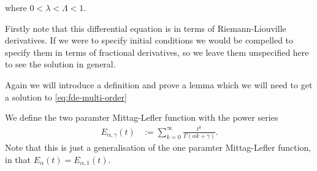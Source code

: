 \documentclass{unswmaths}
\begin{document}
where $ 0 < \lambda < \Lambda < 1 $.


Firstly note that this differential equation is in terms of Riemann-Liouville derivatives. If we were to specify
initial conditions we would be compelled to specify them in terms of fractional derivatives, so we leave them
unspecified here to see the solution in general.

Again we will introduce a definition and prove a lemma which we will need to get a solution to \ref{eq:fde-multi-order}

\begin{definition}
	\label{def:mit-lef-2}
	We define the two paramter Mittag-Lefler function with the power series
	\begin{align*}
		E_{\alpha, \gamma}(t) &:= \sum_{k=0}^\infty \frac{t^k}{\Gamma(\alpha k + \gamma)}.
	\end{align*}
	Note that this is just a generalisation of the one paramter Mittag-Lefler function, in that
	$ E_{\alpha}(t) = E_{\alpha, 1}(t) $.
\end{definition}
\end{document}
